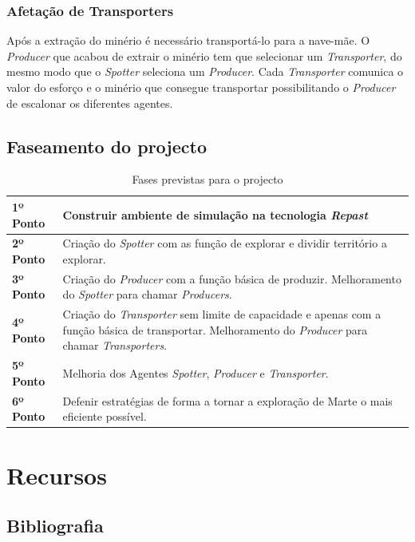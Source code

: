 \documentclass[12pt]{report}
\begin{document}
\FloatBarrier
\subsection{Afetação de Transporters}
Após a extração do minério é necessário transportá-lo para a nave-mãe. O \textit{Producer} que acabou de extrair o minério tem que selecionar 
um \textit{Transporter}, do mesmo modo que o \textit{Spotter} seleciona um \textit{Producer}. Cada \textit{Transporter} comunica o valor
do esforço e o minério que consegue transportar possibilitando o \textit{Producer} de escalonar os diferentes agentes.

\section{Faseamento do projecto}

\begin{table}[htb]
\centering
\caption{Fases previstas para o projecto}
    \sffamily \begin{tabularx}{1.0\textwidth}{ p{3cm}  p{} }
    \hline
    \textbf{1º Ponto} \hfill & Construir ambiente de simulação na tecnologia \textit{Repast} \\ \hline
    \textbf{2º Ponto} \hfill & Criação do \textit{Spotter} com as função de explorar e dividir território a explorar. \\ \hline
    \textbf{3º Ponto} \hfill & Criação do \textit{Producer} com a função básica de produzir. Melhoramento do \textit{Spotter} para chamar \textit{Producers}. \\ \hline
    \textbf{4º Ponto} \hfill & Criação do \textit{Transporter} sem limite de capacidade e apenas com a função básica de transportar. Melhoramento do \textit{Producer} para chamar \textit{Transporters}. \\ \hline
    \textbf{5º Ponto} \hfill & Melhoria dos Agentes \textit{Spotter}, \textit{Producer} e \textit{Transporter}. \\ \hline
    \textbf{6º Ponto} \hfill & Defenir estratégias de forma a tornar a exploração de Marte o mais eficiente possível. \\ \hline
    \end{tabularx} \normalfont
\end{table}

\chapter{Recursos}
\section{Bibliografia}
\end{document}
